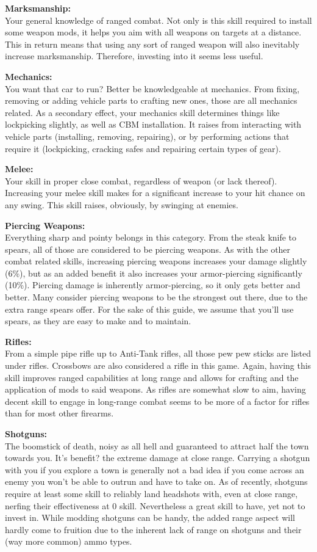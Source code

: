 \documentclass[11pt]{report}
\begin{document}
\textbf{Marksmanship:}\\Your general knowledge of ranged combat. Not only is this skill required to install some weapon mods, it helps you aim with all weapons on targets at a distance. This in return means that using any sort of ranged weapon will also inevitably increase marksmanship. Therefore, investing into it seems less useful.

\textbf{Mechanics:}\\You want that car to run? Better be knowledgeable at mechanics. From fixing, removing or adding vehicle parts to crafting new ones, those are all mechanics related. As a secondary effect, your mechanics skill determines things like lockpicking slightly, as well as CBM installation. It raises from interacting with vehicle parts (installing, removing, repairing), or by performing actions that require it (lockpicking, cracking safes and repairing certain types of gear).

\textbf{Melee:}\\Your skill in proper close combat, regardless of weapon (or lack thereof). Increasing your melee skill makes for a significant increase to your hit chance on any swing. This skill raises, obviously, by swinging at enemies.

\textbf{Piercing Weapons:}\\Everything sharp and pointy belongs in this category. From the steak knife to spears, all of those are considered to be piercing weapons. As with the other combat related skills, increasing piercing weapons increases your damage slightly (6\%), but as an added benefit it also increases your armor-piercing significantly (10\%). Piercing damage is inherently armor-piercing, so it only gets better and better. Many consider piercing weapons to be the strongest out there, due to the extra range spears offer. For the sake of this guide, we assume that you'll use spears, as they are easy to make and to maintain.

\textbf{Rifles:}\\From a simple pipe rifle up to Anti-Tank rifles, all those pew pew sticks are listed under rifles. Crossbows are also considered a rifle in this game. Again, having this skill improves ranged capabilities at long range and allows for crafting and the application of mods to said weapons. As rifles are somewhat slow to aim, having decent skill to engage in long-range combat seems to be more of a factor for rifles than for most other firearms.

\textbf{Shotguns:}\\The boomstick of death, noisy as all hell and guaranteed to attract half the town towards you. It's benefit? the extreme damage at close range. Carrying a shotgun with you if you explore a town is generally not a bad idea if you come across an enemy you won't be able to outrun and have to take on. As of recently, shotguns require at least some skill to reliably land headshots with, even at close range, nerfing their effectiveness at 0 skill. Nevertheless a great skill to have, yet not to invest in. While modding shotguns can be handy, the added range aspect will hardly come to fruition due to the inherent lack of range on shotguns and their (way more common) ammo types.
\end{document}
